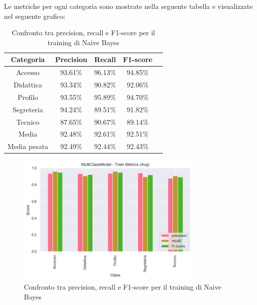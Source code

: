 \newpage

Le metriche per ogni categoria sono mostrate nella seguente tabella e visualizzate nel seguente grafico:

\begin{table}[H]
    \centering
    \begin{tabular}{|c|c|c|c|c|}
        \hline
        \textbf{Categoria} & \textbf{Precision} & \textbf{Recall} & \textbf{F1-score} \\
        \hline
        Accesso & 93.61\% & 96.13\% & 94.85\% \\
        \hline
        Didattica & 93.34\% & 90.82\% & 92.06\% \\
        \hline
        Profilo & 93.55\% & 95.89\% & 94.70\% \\
        \hline
        Segreteria & 94.24\% & 89.51\% & 91.82\% \\
        \hline
        Tecnico & 87.65\% & 90.67\% & 89.14\% \\
        \hline
        Media & 92.48\% & 92.61\% & 92.51\% \\
        \hline
        Media pesata & 92.49\% & 92.44\% & 92.43\% \\
        \hline
    \end{tabular}
    \caption{Confronto tra precision, recall e F1-score per il training di Naive Bayes}
    \label{tab:metriche_naive_bayes_train}
\end{table}

\begin{figure}[H]
    \centering
    \includegraphics[width=0.8\textwidth]{images/metrics_train_naive_bayes.png}
    \caption{Confronto tra precision, recall e F1-score per il training di Naive Bayes}
    \label{fig:metrics_train_naive_bayes}
\end{figure}

